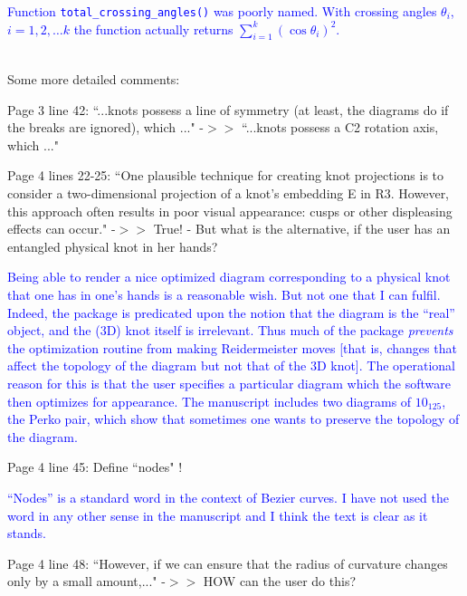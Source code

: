 \documentclass[12pt]{article}
\begin{document}
\textcolor{blue}{Function {\tt total\_crossing\_angles()} was poorly
  named.  With crossing angles $\theta_i$, $i=1,2,\ldots k$ the
  function actually returns $\sum_{i=1}^k\left(\cos\theta_i\right)^2$.
  \\ \\}

Some more detailed comments:

Page 3 line 42: ``...knots possess a line of symmetry (at least, the
diagrams do if the breaks are ignored), which ..."  -$>>$ ``...knots
possess a C2 rotation axis, which ..."

Page 4 lines 22-25: ``One plausible technique for creating knot
projections is to consider a two-dimensional projection of a knot's
embedding E in R3. However, this approach often results in poor visual
appearance: cusps or other displeasing effects can occur."  -$>>$ True!
- But what is the alternative, if the user has an entangled physical
knot in her hands?

\textcolor{blue}{Being able to render a nice optimized diagram
  corresponding to a physical knot that one has in one's hands is a
  reasonable wish.  But not one that I can fulfil.  Indeed, the
  package is predicated upon the notion that the diagram is the
  ``real'' object, and the (3D) knot itself is irrelevant.  Thus much
  of the package {\em prevents} the optimization routine from making
  Reidermeister moves [that is, changes that affect the topology of
    the diagram but not that of the 3D knot].  The operational reason
  for this is that the user specifies a particular diagram which the
  software then optimizes for appearance.  The manuscript includes two
  diagrams of $10_{125}$, the Perko pair, which show that sometimes
  one wants to preserve the topology of the diagram.}
  
Page 4 line 45: Define ``nodes" !

\textcolor{blue}{``Nodes'' is a standard word in the context of Bezier
  curves. I have not used the word in any other sense in the
  manuscript and I think the text is clear as it stands.}

Page 4 line 48: ``However, if we can ensure that the radius of
curvature changes only by a small amount,..."  -$>>$ HOW can the user do
this?
\end{document}
